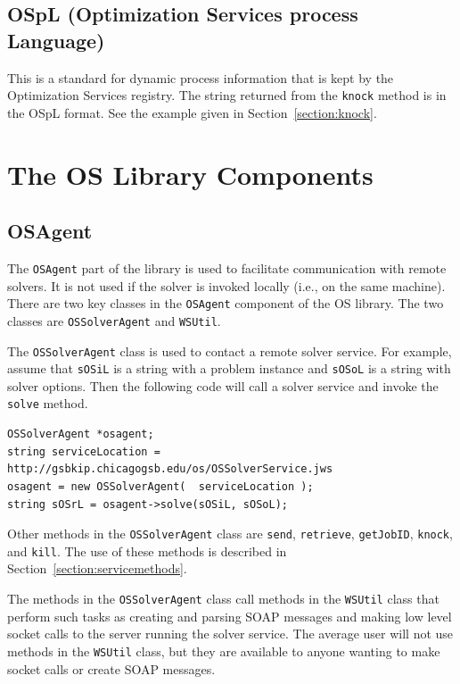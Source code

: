 \documentclass[11pt]{article}
\renewcommand{\_}{{\char"5F}}
\renewcommand{\{}{{\char"7B}}
\renewcommand{\}}{{\char"7D}}
\renewcommand{\^}{{\char"0D}}
\renewcommand{\'}{{\char"0D}}
\begin{document}
\begin{enumerate}[Step 1:]
\subsection{OSpL (Optimization Services process Language)} \label{section:osplschema}
This
is a standard for dynamic process information that is kept by the Optimization Services registry.
The string returned from the {\tt knock} method is in the OSpL format. See the example given in Section~\ref{section:knock}.




\section{The OS Library Components}\label{section:oslibrary}

\subsection{OSAgent}\label{section:osagent}

The {\tt OSAgent}  part of the library is used to facilitate communication 
with remote solvers. It is not used if the solver is invoked locally (i.e., on the same machine).   
There are two key classes in the {\tt OSAgent} component of the OS library. The two classes are 
{\tt OSSolverAgent} and {\tt WSUtil}.

The {\tt OSSolverAgent} class is used to contact a remote solver service.  For example, assume that {\tt sOSiL} 
is a string with a problem instance and {\tt sOSoL} is a string with solver options. Then the following code 
will call a solver service and invoke the {\tt solve} method.
\begin{verbatim}
OSSolverAgent *osagent;
string serviceLocation = http://gsbkip.chicagogsb.edu/os/OSSolverService.jws
osagent = new OSSolverAgent(  serviceLocation );
string sOSrL = osagent->solve(sOSiL, sOSoL);
\end{verbatim}
Other methods in the {\tt OSSolverAgent} class are {\tt send}, {\tt retrieve}, {\tt getJobID}, {\tt knock}, and {\tt kill}.  The use of these methods is described in Section~\ref{section:servicemethods}.



The methods in the {\tt OSSolverAgent} class call methods in the {\tt WSUtil} class that perform such tasks as creating and parsing SOAP messages and making low level socket calls to the server running the solver service. The average user will not use methods in the {\tt WSUtil} class, but they are available to anyone wanting to make socket calls or create SOAP messages.


\end{enumerate}
\end{document}
